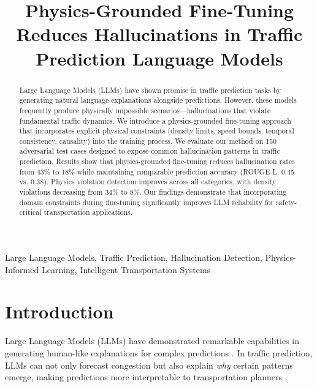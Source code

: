\documentclass[conference]{IEEEtran}
\begin{document}
\title{Physics-Grounded Fine-Tuning Reduces Hallucinations in Traffic Prediction Language Models}

\author{
}

\maketitle

\begin{abstract}
Large Language Models (LLMs) have shown promise in traffic prediction tasks by generating natural language explanations alongside predictions. However, these models frequently produce physically impossible scenarios—hallucinations that violate fundamental traffic dynamics. We introduce a physics-grounded fine-tuning approach that incorporates explicit physical constraints (density limits, speed bounds, temporal consistency, causality) into the training process. We evaluate our method on 150 adversarial test cases designed to expose common hallucination patterns in traffic prediction. Results show that physics-grounded fine-tuning reduces hallucination rates from 43\% to 18\% while maintaining comparable prediction accuracy (ROUGE-L: 0.45 vs. 0.38). Physics violation detection improves across all categories, with density violations decreasing from 34\% to 8\%. Our findings demonstrate that incorporating domain constraints during fine-tuning significantly improves LLM reliability for safety-critical transportation applications.
\end{abstract}

\begin{IEEEkeywords}
Large Language Models, Traffic Prediction, Hallucination Detection, Physics-Informed Learning, Intelligent Transportation Systems
\end{IEEEkeywords}

\section{Introduction}

Large Language Models (LLMs) have demonstrated remarkable capabilities in generating human-like explanations for complex predictions \cite{brown2020language, achiam2023gpt4}. In traffic prediction, LLMs can not only forecast congestion but also explain \emph{why} certain patterns emerge, making predictions more interpretable to transportation planners \cite{yuan2024survey}.
\end{document}
